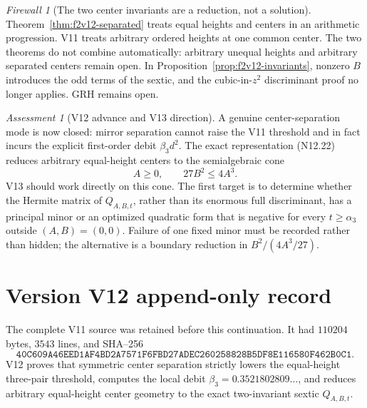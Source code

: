 \documentclass[11pt]{article}
\theoremstyle{definition}
\theoremstyle{remark}
\newtheorem{assessment}[theorem]{Assessment}
\newtheorem{firewall}[theorem]{Firewall}
\begin{document}
\begin{firewall}[The two center invariants are a reduction, not a solution]
Theorem~\ref{thm:f2v12-separated} treats equal heights and centers in an
arithmetic progression.  V11 treats arbitrary ordered heights at one
common center.  The two theorems do not combine automatically: arbitrary
unequal heights and arbitrary separated centers remain open.  In
Proposition~\ref{prop:f2v12-invariants}, nonzero \(B\) introduces the odd
terms of the sextic, and the cubic-in-\(z^2\) discriminant proof no longer
applies.  GRH remains open.
\end{firewall}

\begin{assessment}[V12 advance and V13 direction]
A genuine center-separation mode is now closed: mirror separation cannot
raise the V11 threshold and in fact incurs the explicit first-order debit
\(\beta_3d^2\).  The exact representation
\textup{(N12.22)} reduces arbitrary equal-height centers to the
semialgebraic cone
\[
 A\ge0,\qquad 27B^2\le4A^3.
 \tag{N12.24}
\]
V13 should work directly on this cone.  The first target is to determine
whether the Hermite matrix of \(Q_{A,B,t}\), rather than its enormous full
discriminant, has a principal minor or an optimized quadratic form that is
negative for every \(t\ge\alpha_3\) outside \((A,B)=(0,0)\).  Failure of
one fixed minor must be recorded rather than hidden; the alternative is a
boundary reduction in \(B^2/(4A^3/27)\).
\end{assessment}

\section*{Version V12 append-only record}
The complete V11 source was retained before this continuation.  It had
\(110204\) bytes, \(3543\) lines, and SHA--256
\[
 \texttt{40C609A46EED1AF4BD2A7571F6FBD27ADEC260258828B5DF8E116580F462B0C1}.
\]
V12 proves that symmetric center separation strictly lowers the
equal-height three-pair threshold, computes the local debit
\(\beta_3=0.3521802809\ldots\), and reduces arbitrary equal-height center
geometry to the exact two-invariant sextic \(Q_{A,B,t}\).



\end{document}
